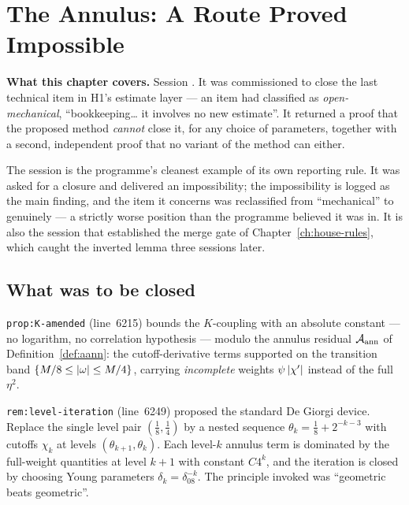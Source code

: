 \chapter{The Annulus: A Route Proved Impossible}
\label{ch:annulus}

\begin{record}
\textbf{What this chapter covers.} Session . It was commissioned to
close the last technical item in H1's estimate layer --- an item  had
classified as \emph{open-mechanical}, ``bookkeeping\dots{} it involves no new
estimate''. It returned a proof that the proposed method \emph{cannot} close
it, for any choice of parameters, together with a second, independent proof
that no variant of the method can either.

\smallskip
The session is the programme's cleanest example of its own reporting rule.
It was asked for a closure and delivered an impossibility; the impossibility
is logged as the main finding, and the item it concerns was reclassified from
``mechanical'' to genuinely \OPEN{} --- a strictly worse position than the
programme believed it was in. It is also the session that established the
merge gate of Chapter~\ref{ch:house-rules}, which caught the inverted lemma
three sessions later.
\end{record}

\section{What was to be closed}
\label{sec:annulus-setting}

\texttt{prop:K-amended} (line~6215) bounds the \(K\)-coupling with an absolute
constant --- no logarithm, no correlation hypothesis --- modulo the annulus
residual \(\mathcal{A}_{\mathrm{ann}}\) of Definition~\ref{def:aann}: the cutoff-derivative terms
supported on the transition band \(\{M/8\le\left|\omega\right|\le M/4\}\), carrying
\emph{incomplete} weights \(\psi\left|\chi'\right|\) instead of the full \(\eta^2\).

\texttt{rem:level-iteration} (line~6249) proposed the standard De Giorgi
device. Replace the single level pair \((\tfrac18,\tfrac14)\) by a nested
sequence \(\theta_k=\tfrac18+2^{-k-3}\) with cutoffs \(\chi_k\) at levels
\((\theta_{k+1},\theta_k)\). Each level-\(k\) annulus term is dominated by the
full-weight quantities at level \(k+1\) with constant \(C4^k\), and the
iteration is closed by choosing Young parameters \(\delta_k=\delta_08^{-k}\).
The principle invoked was ``geometric beats geometric''.

